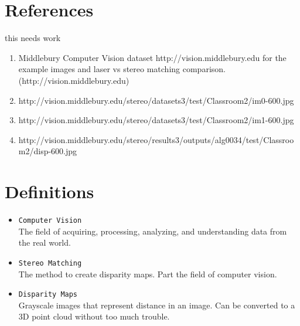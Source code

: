 \documentclass[11pt,fleqn]{article}
\begin{document}
\begin{appendices}

\section{References}

this needs work

\begin{enumerate}
\item Middlebury Computer Vision dataset
http://vision.middlebury.edu for the example images and laser vs stereo matching comparison. (http://vision.middlebury.edu)
\item http://vision.middlebury.edu/stereo/datasets3/test/Classroom2/im0-600.jpg
\item http://vision.middlebury.edu/stereo/datasets3/test/Classroom2/im1-600.jpg
\item http://vision.middlebury.edu/stereo/results3/outputs/alg0034/test/Classroom2/disp-600.jpg
\end{enumerate}


\section{Definitions}
\begin{itemize}
\item \texttt{Computer Vision}\\[2pt]
The field of acquiring, processing, analyzing, and understanding data from the real world.

\item \texttt{Stereo Matching}\\[2pt]
The method to create disparity maps. Part the field of computer vision.

\item \texttt{Disparity Maps}\\[2pt]
Grayscale images that represent distance in an image. Can be converted to a 3D point cloud without too much trouble.
\end{itemize}

\end{appendices}
\end{document}
